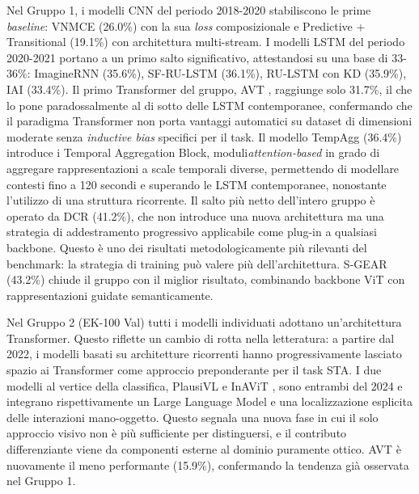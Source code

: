Nel Gruppo 1, i modelli CNN del periodo 2018-2020 stabiliscono le prime \textit{baseline}: VNMCE \cite{furnari2018leveraging} (26.0\%) con la sua \textit{loss} composizionale e Predictive + Transitional \cite{miech2019leveraging} (19.1\%) con architettura multi-stream. I modelli LSTM del periodo 2020-2021 portano a un primo salto significativo, attestandosi su una base di 33-36\%: ImagineRNN \cite{wu2020learning} (35.6\%), SF-RU-LSTM \cite{osman2021slowfast} (36.1\%), RU-LSTM con KD \cite{camporese2021knowledge} (35.9\%), IAI \cite{zhang2020egocentric} (33.4\%). Il primo Transformer del gruppo, AVT \cite{girdhar2021anticipative}, raggiunge solo 31.7\%, il che lo pone paradossalmente al di sotto delle LSTM contemporanee, confermando che il paradigma Transformer non porta vantaggi automatici su dataset di dimensioni moderate senza \textit{inductive bias} specifici per il task. Il modello TempAgg \cite{sener2021technical, sener2020temporal} (36.4\%) introduce i Temporal Aggregation Block, moduli\textit{attention-based} in grado di aggregare rappresentazioni a scale temporali diverse, permettendo di modellare contesti fino a 120 secondi e superando le LSTM contemporanee, nonostante l'utilizzo di una struttura ricorrente.  Il salto più netto dell'intero gruppo è operato da DCR \cite{xu2022learning}(41.2\%), che non introduce una nuova architettura ma una strategia di addestramento progressivo applicabile come plug-in a qualsiasi backbone. Questo è uno dei risultati metodologicamente più rilevanti del benchmark: la strategia di training può valere più dell'architettura. S-GEAR \cite{diko2024semantically} (43.2\%) chiude il gruppo con il miglior risultato, combinando backbone ViT con rappresentazioni guidate semanticamente.

Nel Gruppo 2 (EK-100 Val) tutti i modelli individuati adottano un'architettura Transformer. Questo riflette un cambio di rotta nella letteratura: a partire dal 2022, i modelli basati su architetture ricorrenti hanno progressivamente lasciato spazio ai Transformer come approccio preponderante per il task STA. I due modelli al vertice della classifica, PlausiVL \cite{mittal2024can} e InAViT \cite{roy2024interaction}, sono entrambi del 2024 e integrano rispettivamente un Large Language Model e una localizzazione esplicita delle interazioni mano-oggetto. Questo segnala una nuova fase in cui il solo approccio visivo non è più sufficiente per distinguersi, e il contributo differenziante viene da componenti esterne al dominio puramente ottico. AVT \cite{girdhar2021anticipative} è nuovamente il meno performante (15.9\%), confermando la tendenza già osservata nel Gruppo 1.

